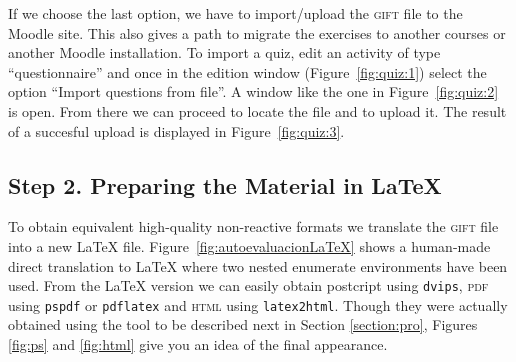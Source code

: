 \documentclass{pracjourn}[2006/02/20]
\begin{document}
If we choose the last option, we have to import/upload the
\textsc{gift}  file to the Moodle site.
This also gives a path 
to migrate the exercises to another courses or
another Moodle installation.
To import a quiz, edit an activity of type ``questionnaire''
and once in the edition window (Figure~\ref{fig:quiz:1}) 
select the option ``Import questions from file''.
A window like the one in Figure~\ref{fig:quiz:2} is open. 
From there we can proceed to locate the file and to upload it.
The result of a succesful upload is displayed in Figure~\ref{fig:quiz:3}.

\subsection*{Step 2. Preparing the Material in \LaTeX{}}

To obtain equivalent high-quality non-reactive formats
we translate the \textsc{gift} file into a new \LaTeX{}
file.
Figure~\ref{fig:autoevaluacionLaTeX} shows a human-made
direct translation  to \LaTeX{} where two
nested enumerate environments have been used.
From the \LaTeX{} version we can easily obtain
postcript using \texttt{dvips}, 
\textsc{pdf} using \texttt{pspdf} or \texttt{pdflatex}
and \textsc{html} 
using \texttt{latex2html}.
Though they were actually obtained using the tool to be described
next in Section
\ref{section:pro}, Figures \ref{fig:ps} and
\ref{fig:html}
give you an idea of the final 
appearance.
\end{document}
